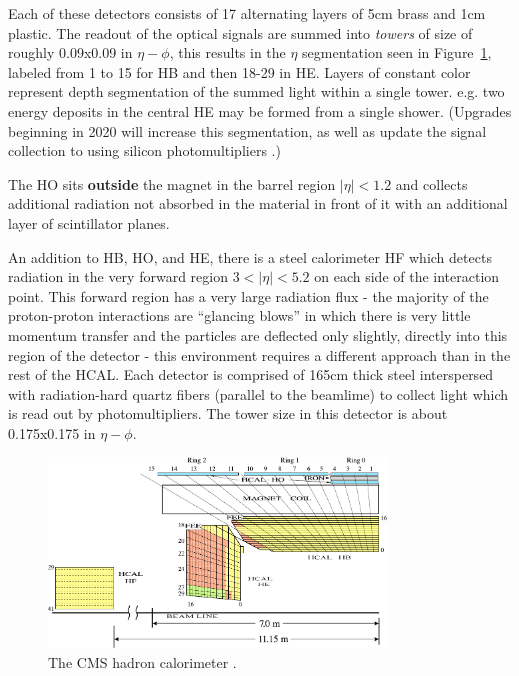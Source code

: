 Each of these detectors consists of 17 alternating layers of 5cm brass and 1cm plastic. The readout of the optical signals are summed into \textit{towers} of size of roughly 0.09x0.09 in $\eta-\phi$, this results in the $\eta$ segmentation seen in Figure~\ref{fig:hcal}, labeled from 1 to 15 for HB and then 18-29 in HE.  Layers of constant color represent depth segmentation of the summed light within a single tower.  e.g. two energy deposits in the central HE may be formed from a single shower. (Upgrades beginning in 2020 will increase this segmentation, as well as update the signal collection to using silicon photomultipliers  \cite{hcalupgrade}.)

The HO sits \textbf{outside} the magnet in the barrel region $|\eta|<1.2$ and collects additional radiation not absorbed in the material in front of it with an additional layer of scintillator planes.

An addition to HB, HO, and HE, there is a steel calorimeter HF which detects radiation in the very forward region $3<|\eta|<5.2$ on each side of the interaction point. This forward region has a very large radiation flux - the majority of the proton-proton interactions are ``glancing blows'' in which there is very little momentum transfer and the particles are deflected only slightly, directly into this region of the detector - this environment requires a different approach than in the rest of the HCAL. Each detector is comprised of 165cm thick steel interspersed with radiation-hard quartz fibers (parallel to the beamlime) to collect light which is read out by photomultipliers. The tower size in this detector is about 0.175x0.175 in $\eta-\phi$.

\begin{figure}[hbp!]
\centering
\includegraphics[width=0.8\textwidth]{figs/hcal.pdf}
\caption[The CMS hadron calorimeter.]{The CMS hadron calorimeter \cite{cosmichcal}.}
\label{fig:hcal}
\end{figure}

